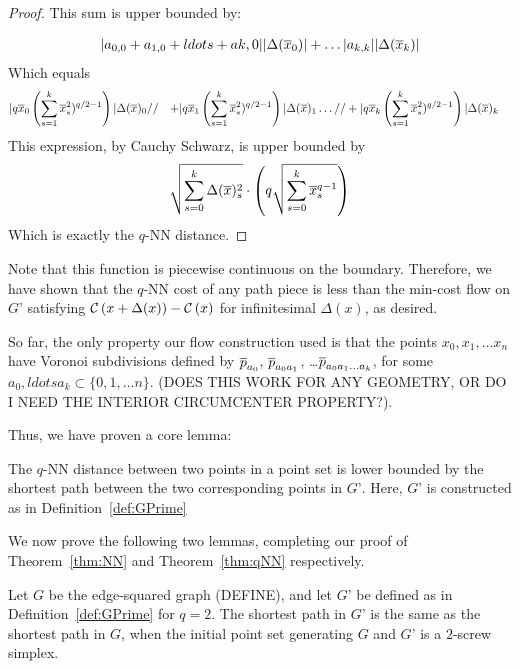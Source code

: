 \begin{proof}
This sum is upper bounded by:

\begin{align}
|a_{0, 0} + a_{1, 0} + ldots + a{k, 0}| |\Delta(\overline{x}_0)|
+ \ldots
|a_{k, k}| |\Delta(\overline{x}_k)|
\end{align}
Which equals
\begin{align}
&|q\overline{x}_0\left(\sum_{s=1}^k \overline{x}_s^2)^{q/2-1}\right)| \Delta(\overline{x})_0
//&+
|q\overline{x}_1\left(\sum_{s=1}^k \overline{x}_s^2)^{q/2-1}\right)| \Delta(\overline{x})_1
\ldots
//& +
|q\overline{x}_k\left(\sum_{s=1}^k \overline{x}_s^2)^{q/2-1}\right)| \Delta(\overline{x})_k
\end{align}
This expression, by Cauchy Schwarz, is upper bounded by
\[
\sqrt{\sum_{s=0}^k \Delta(\overline{x})_s^2} \cdot \left(q\sqrt{\sum_{s=0}^k
\overline{x}_s^{q-1}}\right)
\]
Which is exactly the $q$-NN distance.

\end{proof}

Note that this function is piecewise continuous on the boundary. Therefore,
we have shown that the $q$-NN cost of any path piece is less than the
min-cost flow on $G’$ satisfying
$\mathcal{C}\left(x+\Delta(x)\right)-\mathcal{C}\left(x\right)$ for infinitesimal
$\Delta(x)$, as desired.

So far, the only property our flow construction used is that the points
$x_0, x_1, \ldots x_n$ have Voronoi subdivisions defined by $\overline{p}_{a_0}$,
$\overline{p}_{a_0a_1}$, \ldots $\overline{p}_{a_0a_1\ldots a_k}$, for some $a_0, ldots a_k
\subset \{0, 1, \ldots n\}$. (DOES THIS WORK FOR ANY GEOMETRY, OR DO I NEED
THE INTERIOR CIRCUMCENTER PROPERTY?).

Thus, we have proven a core lemma:

\begin{lemma}\label{lem:qNN-GPrime}

The $q$-NN distance between two points in a point set is lower bounded by
the shortest path between the two corresponding points in $G’$. Here, $G’$
is constructed as in Definition~\ref{def:GPrime}

\end{lemma}

We now prove the following two lemmas, completing our proof of
Theorem~\ref{thm:NN} and Theorem~\ref{thm:qNN} respectively.

\begin{lemma}\label{lem:edge-squared-GPrime} Let $G$ be the edge-squared graph
(DEFINE), and let $G’$ be defined as in Definition~\ref{def:GPrime} for $q=2$.
The shortest path in $G’$ is the same as the shortest path in $G$, when the
initial point set generating $G$ and $G’$ is a $2$-screw simplex.

\end{lemma}


